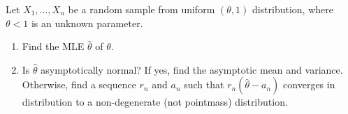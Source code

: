 
\begin{exercise}

Let $X_1,\dots,X_n$ be a random sample from uniform $(\theta,1)$ distribution,
where $\theta < 1$ is an unknown parameter.

\begin{enumerate}[label = (\alph*)]
  \item Find the MLE $\hat{\theta}$ of $\theta$.
  \item Is $\hat{\theta}$ asymptotically normal? If yes, find the asymptotic
  mean and variance. Otherwise, find a sequence $r_n$ and $a_n$ such that
  $r_n(\hat{\theta} - a_n)$ converges in distribution to a non-degenerate
  (not pointmass) distribution.
\end{enumerate}

\end{exercise}


